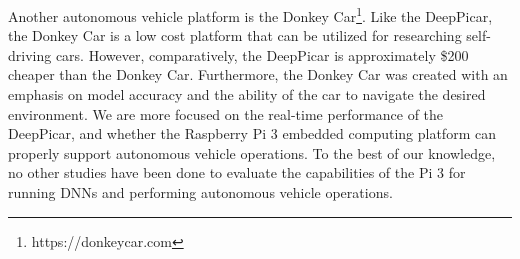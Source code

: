 Another autonomous vehicle platform is the Donkey Car\footnote{https://donkeycar.com}.
Like the DeepPicar, the Donkey Car is a low cost platform that can be 
utilized for researching self-driving cars. However, comparatively, the
DeepPicar is approximately \$200 cheaper than the Donkey Car. 
Furthermore, the Donkey Car was created with an emphasis on model accuracy
and the ability of the car to navigate the desired environment. We are 
more focused on the real-time performance of the DeepPicar, and whether
the Raspberry Pi 3 embedded computing platform can properly support autonomous 
vehicle operations. To the best of our knowledge, no other studies have
been done to evaluate the capabilities of the Pi 3 for running DNNs and
performing autonomous vehicle operations.
